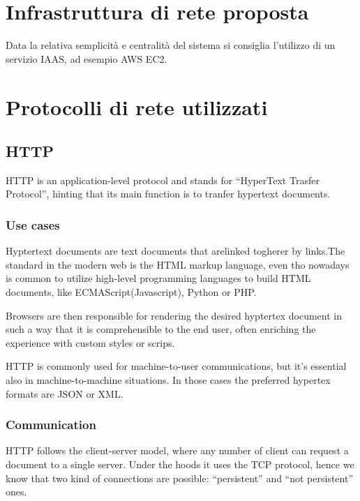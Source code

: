 \documentclass{article}
\begin{document}
\tableofcontents

\section{Infrastruttura di rete proposta}

Data la relativa semplicità e centralità del sistema si consiglia l'utilizzo di un servizio IAAS, ad esempio AWS EC2.

\section{Protocolli di rete utilizzati}

\subsection{HTTP}

HTTP is an application-level protocol and stands for ``HyperText Trasfer Protocol'', hinting that its main function is to tranfer hypertext documents.

\subsubsection{Use cases}

Hyptertext documents are text documents that arelinked togherer by links.The standard in the modern web is the HTML markup language, even tho nowadays is common to utilize high-level programming languages to build HTML documents, like ECMAScript(Javascript), Python or PHP.

Browsers are then responsible for rendering the desired hyptertex document in such a way that it is comprehensible to the end user, often enriching the experience with custom styles or scrips.

HTTP is commonly used for machine-to-user communications, but it's essential also in machine-to-machine situations. In those cases the preferred hypertex formats are JSON or XML.

\subsubsection{Communication}

HTTP follows the client-server model, where any number of client can request a document to a single server. Under the hoods it uses the TCP protocol, hence we know that two kind of connections are possible: ``persistent'' and ``not persistent'' ones.
\end{document}
